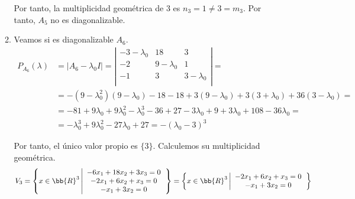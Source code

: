 \begin{ejercicio}
\begin{enumerate}
\begin{enumerate}
            Por tanto, la multiplicidad geométrica de $3$ es $n_3=1 \neq 3 = m_3$. Por tanto, $A_5$ no es diagonalizable.

            \item Veamos si es diagonalizable $A_6$.\\
            \begin{equation*}\begin{split}
                P_{A_6}(\lambda) & = |A_6-\lambda_0 I| = \left| \begin{array}{ccc}
                -3-\lambda_0 & 18 & 3 \\
                -2 & 9-\lambda_0 & 1 \\
                -1 & 3 & 3-\lambda_0 \\
                \end{array}\right| =\\
                & = -(9-\lambda_0^2)(9-\lambda_0)-18-18 +3(9-\lambda_0)+3(3+\lambda_0)+36(3-\lambda_0) =\\
                &= -81 +9\lambda_0 +9\lambda_0^2 -\lambda_0^3 -36 +27-3\lambda_0+9+3\lambda_0+108-36\lambda_0 =\\
                &= -\lambda_0^3 +9\lambda_0^2 -27\lambda_0 + 27 = -(\lambda_0-3)^3
            \end{split}\end{equation*}

            \begin{figure}[H]
                \centering
            \end{figure}

            Por tanto, el único valor propio es $\{3\}$. Calculemos su multiplicidad geométrica.
            \begin{equation*}
            V_3 = \left\{x\in\bb{R}^3 \left| \begin{array}{c}
                 -6x_1+18x_2+3x_3=0  \\
                 -2x_1+6x_2+x_3=0  \\
                 -x_1+3x_2 = 0
            \end{array}\right.\right\}
            = \left\{x\in\bb{R}^3 \left| \begin{array}{c}
                 -2x_1+6x_2+x_3=0  \\
                 -x_1+3x_2 = 0
            \end{array}\right.\right\}
            \end{equation*}


\end{enumerate}
\end{enumerate}
\end{ejercicio}
